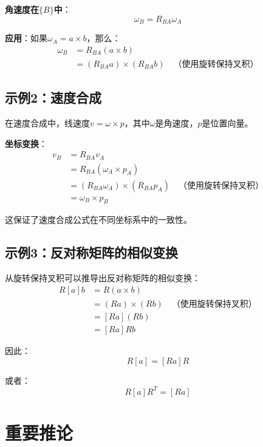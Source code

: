 \documentclass[12pt,a4paper]{article}
\begin{document}
\textbf{角速度在$\{B\}$中}：
\begin{equation}
\omega_B = R_{BA} \omega_A
\end{equation}

\textbf{应用}：如果$\omega_A = a \times b$，那么：
\begin{align}
\omega_B &= R_{BA} (a \times b) \\
&= (R_{BA} a) \times (R_{BA} b) \quad \text{（使用旋转保持叉积）}
\end{align}

\subsection{示例2：速度合成}

在速度合成中，线速度$v = \omega \times p$，其中$\omega$是角速度，$p$是位置向量。

\textbf{坐标变换}：
\begin{align}
v_B &= R_{BA} v_A \\
&= R_{BA} (\omega_A \times p_A) \\
&= (R_{BA} \omega_A) \times (R_{BA} p_A) \quad \text{（使用旋转保持叉积）} \\
&= \omega_B \times p_B
\end{align}

这保证了速度合成公式在不同坐标系中的一致性。

\subsection{示例3：反对称矩阵的相似变换}

从旋转保持叉积可以推导出反对称矩阵的相似变换：
\begin{align}
R [a] b &= R (a \times b) \\
&= (Ra) \times (Rb) \quad \text{（使用旋转保持叉积）} \\
&= [Ra] (Rb) \\
&= [Ra] R b
\end{align}

因此：
\begin{equation}
R [a] = [Ra] R
\end{equation}

或者：
\begin{equation}
R [a] R^T = [Ra]
\end{equation}

\section{重要推论}
\end{document}
